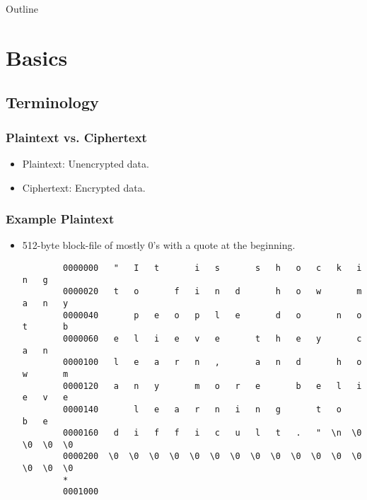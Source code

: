 \documentclass[xcolor={dvipsnames,svgnames},hyperref=dvips]{beamer}
\title[Full-Disk Encryption]{}
\author{Wade Cline}
\date{04 March 2014}
\begin{document}
\begin{frame}
  \titlepage
\end{frame}

\begin{frame}{Outline}
  \tableofcontents
\end{frame}

\section{Basics}\label{section:basics}
	\subsection{Terminology}
	\begin{frame}
		\frametitle{Plaintext vs. Ciphertext}
		\begin{itemize}
		\item Plaintext: Unencrypted data.
		\item Ciphertext: Encrypted data.
		\end{itemize}
	\end{frame}

	\begin{frame}[fragile]
		\frametitle{Example Plaintext}
		\begin{itemize}
		\item 512-byte block-file of mostly 0's with a quote at the beginning. \\
		\begin{lstlisting}
		0000000   "   I   t       i   s       s   h   o   c   k   i   n   g    
		0000020   t   o       f   i   n   d       h   o   w       m   a   n   y
		0000040       p   e   o   p   l   e       d   o       n   o   t       b
		0000060   e   l   i   e   v   e       t   h   e   y       c   a   n    
		0000100   l   e   a   r   n   ,       a   n   d       h   o   w       m
		0000120   a   n   y       m   o   r   e       b   e   l   i   e   v   e
		0000140       l   e   a   r   n   i   n   g       t   o       b   e    
		0000160   d   i   f   f   i   c   u   l   t   .   "  \n  \0  \0  \0  \0
		0000200  \0  \0  \0  \0  \0  \0  \0  \0  \0  \0  \0  \0  \0  \0  \0  \0
		*
		0001000
		\end{lstlisting}
		\end{itemize}
	\end{frame}
\end{document}
